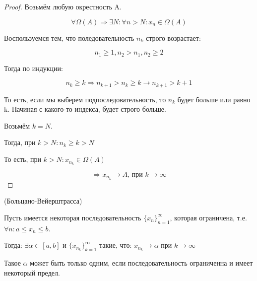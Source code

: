 \begin{proof}
    Возьмём любую окрестность A.

    \[ \forall \Omega (A) \Rightarrow \exists N: \forall n > N: x_n \in \Omega (A) \]

    Воспользуемся тем, что поледовательность $n_k$ строго возрастает:

    \[n_1 \geq 1, n_2 > n_1, n_2 \geq 2 \]

    Тогда по индукции:

    \[n_k \geq k \Rightarrow n_{k + 1} > n_k \geq k \rightarrow n_{k + 1} > k+1\]

    То есть, если мы выберем подпоследовательность, то $n_k$ будет больше или равно k. Начиная с какого-то индекса, будет строго больше.

    Возьмём $k = N$.

    Тогда, при $k > N: n_k \geq k > N$

    То есть, при $k > N: x_{n_k} \in \Omega (A)$

    \[\Rightarrow x_{n_k} \to A \text{, при $k \to \infty$} \]
\end{proof}


\begin{theorem}(Больцано-Вейерштрасса)


    Пусть имеется некоторая последовательность $\{x_n\}_{n=1}^\infty$, которая ограничена, т.е. $\forall n: a \leq x_n \leq b$.
    
    Тогда: $\exists \alpha \in [a, b] \text{ и } \{x_{n_k}\}_{k=1}^\infty$ такие, что: $x_{n_k} \to \alpha \text{ при } k \to \infty  $

    \begin{remark}
        Такое $\alpha$ может быть только одним, если последовательность ограниченна и имеет некоторый предел.
    \end{remark}

\end{theorem}

